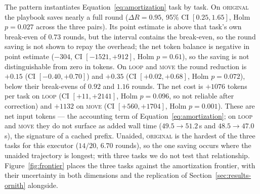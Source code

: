 \documentclass[smallcondensed,natbib]{svjour3}
\begin{document}
\begin{table}
\caption{Study 1 (pilot M1): the same human playbook on three tasks of
the same family ($n=20$ per cell, gpt-oss:20b, seeds 42--61).
$\Delta R$ = mean rounds saved by the playbook; net $\Delta$tokens =
mean input tokens (playbook) $-$ mean input tokens (none), negative =
the playbook saves net tokens. Point estimates only; confidence
intervals and Holm-corrected tests are in the text, and wall-time
contrasts are secondary (Section~\ref{sec:threats}). Per-task
break-even $\Delta R^{*}$: $0.73$, $0.92$ and $1.16$ rounds.
Tokens per round are total input tokens over total rounds in each
arm.}
\label{tab:m1}
\end{table}

The pattern instantiates Equation~\eqref{eq:amortization} task by
task. On \textsc{original} the playbook saves nearly a full round
($\Delta R = 0.95$, 95\% CI $[0.25, 1.65]$, Holm $p=0.027$ across the
three pairs). Its point estimate is above that task's own break-even
of $0.73$ rounds, but the interval contains the break-even, so the
round saving is not shown to repay the overhead; the
net token balance is negative in point estimate ($-304$, CI $[-1521,
+912]$, Holm $p=0.61$), so the saving is not distinguishable from zero
in tokens. On \textsc{loop} and \textsc{move} the round reduction is
$+0.15$ (CI $[-0.40, +0.70]$) and $+0.35$ (CI $[+0.02, +0.68]$, Holm
$p=0.072$), below their break-evens of $0.92$ and $1.16$ rounds. The
net cost is $+1076$ tokens per task on \textsc{loop} (CI $[+11,
+2141]$, Holm $p=0.096$, so not reliable after correction) and $+1132$
on \textsc{move} (CI $[+560, +1704]$, Holm $p=0.001$).
These are net input tokens --- the accounting term of
Equation~\eqref{eq:amortization}; on \textsc{loop} and \textsc{move}
they do not surface as added wall time ($49.5\to51.2$\,s and
$48.5\to47.0$\,s), the signature of a cached prefix. Unaided,
\textsc{original} is the hardest of the three tasks for this executor
($14/20$, $6.70$ rounds), so the one saving occurs where the unaided
trajectory is longest; with three tasks we do not test that
relationship.
Figure~\ref{fig:frontier} places the
three tasks against the amortization frontier, with their uncertainty
in both dimensions and the replication of
Section~\ref{sec:results-ornith} alongside.
\end{document}
